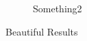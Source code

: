 \documentclass[12pt,letterpaper]{article}
\begin{document}
\begin{figure}[ht]
\begin{subfigure}{.5\textwidth}
        \caption{Something2}
        \label{fig:sub-second}
    \end{subfigure}
\caption{Beautiful Results}
\end{figure}





\end{document}
